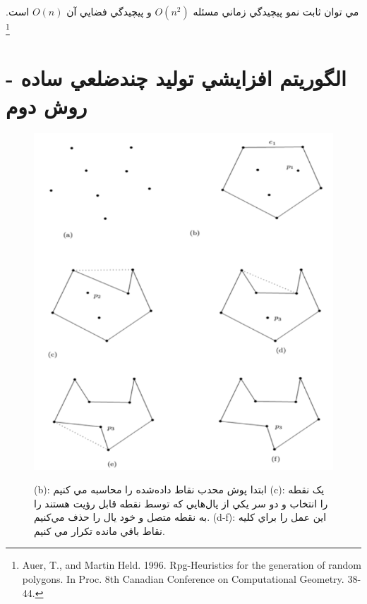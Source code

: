 \documentclass{book}
\begin{document}
مي توان ثابت نمو پيچيدگي زماني مسئله $O(n^2)$ و پيچيدگي فضايي آن $O(n)$ است. \footnote{Auer, T., and Martin Held. 1996. Rpg-Heuristics for the generation of random polygons. In Proc. 8th Canadian Conference on Computational Geometry. 38-44.}

\section{الگوريتم افزايشي توليد چندضلعي ساده - روش دوم}

\begin{figure}[h!]
    \begin{center}
        \includegraphics[width=\linewidth]{simp_sec.png}
        \label{simp_sec}
        \caption{(b): ابتدا پوش محدب نقاط داده‌شده را محاسبه مي کنيم (c): يک نقطه را انتخاب و دو سر يکي از يال‌هايي که توسط نقطه قابل رؤيت هستند را  به نقطه متصل و خود  يال را حذف مي‌کنيم.  (d-f): اين عمل را براي کليه نقاط باقي مانده تکرار مي کنيم.}
    \end{center}
\end{figure}
\end{document}
